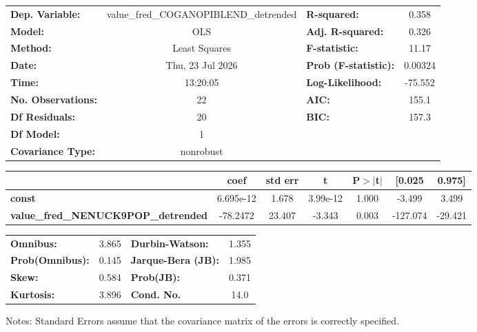 \begin{center}
\begin{tabular}{lclc}
\toprule
\textbf{Dep. Variable:}                     & value\_fred\_COGANOPIBLEND\_detrended & \textbf{  R-squared:         } &     0.358   \\
\textbf{Model:}                             &                  OLS                  & \textbf{  Adj. R-squared:    } &     0.326   \\
\textbf{Method:}                            &             Least Squares             & \textbf{  F-statistic:       } &     11.17   \\
\textbf{Date:}                              &            Thu, 23 Jul 2026           & \textbf{  Prob (F-statistic):} &  0.00324    \\
\textbf{Time:}                              &                13:20:05               & \textbf{  Log-Likelihood:    } &   -75.552   \\
\textbf{No. Observations:}                  &                     22                & \textbf{  AIC:               } &     155.1   \\
\textbf{Df Residuals:}                      &                     20                & \textbf{  BIC:               } &     157.3   \\
\textbf{Df Model:}                          &                      1                & \textbf{                     } &             \\
\textbf{Covariance Type:}                   &               nonrobust               & \textbf{                     } &             \\
\bottomrule
\end{tabular}
\begin{tabular}{lcccccc}
                                            & \textbf{coef} & \textbf{std err} & \textbf{t} & \textbf{P$> |$t$|$} & \textbf{[0.025} & \textbf{0.975]}  \\
\midrule
\textbf{const}                              &    6.695e-12  &        1.678     &  3.99e-12  &         1.000        &       -3.499    &        3.499     \\
\textbf{value\_fred\_NENUCK9POP\_detrended} &     -78.2472  &       23.407     &    -3.343  &         0.003        &     -127.074    &      -29.421     \\
\bottomrule
\end{tabular}
\begin{tabular}{lclc}
\textbf{Omnibus:}       &  3.865 & \textbf{  Durbin-Watson:     } &    1.355  \\
\textbf{Prob(Omnibus):} &  0.145 & \textbf{  Jarque-Bera (JB):  } &    1.985  \\
\textbf{Skew:}          &  0.584 & \textbf{  Prob(JB):          } &    0.371  \\
\textbf{Kurtosis:}      &  3.896 & \textbf{  Cond. No.          } &     14.0  \\
\bottomrule
\end{tabular}
\end{center}

Notes: \newline
 [1] Standard Errors assume that the covariance matrix of the errors is correctly specified.